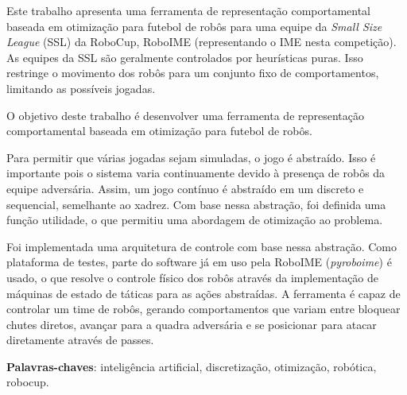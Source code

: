 \setlength{\absparsep}{18pt} %
\begin{resumo}

  Este trabalho apresenta uma ferramenta de representação comportamental baseada
  em otimização para futebol de robôs para uma equipe da \textit{Small Size
  League} (SSL) da RoboCup, RoboIME (representando o IME nesta competição).  As
  equipes da SSL são geralmente controlados por heurísticas puras.  Isso
  restringe o movimento dos robôs para um conjunto fixo de comportamentos,
  limitando as possíveis jogadas.

  O objetivo deste trabalho é desenvolver uma ferramenta de representação
  comportamental baseada em otimização para futebol de robôs.

  Para permitir que várias jogadas sejam simuladas, o jogo é abstraído.  Isso é
  importante pois o sistema varia continuamente devido à presença de robôs da
  equipe adversária.  Assim, um jogo contínuo é abstraído em um discreto e
  sequencial, semelhante ao xadrez.  Com base nessa abstração, foi definida uma
  função utilidade, o que permitiu uma abordagem de otimização ao problema.

  Foi implementada uma arquitetura de controle com base nessa abstração.  Como
  plataforma de testes, parte do software já em uso pela RoboIME
  (\textit{pyroboime}) é usado, o que resolve o controle físico dos robôs
  através da implementação de máquinas de estado de táticas para as ações
  abstraídas.  A ferramenta é capaz de controlar um time de robôs, gerando
  comportamentos que variam entre bloquear chutes diretos, avançar para a quadra
  adversária e se posicionar para atacar diretamente através de passes.

  \textbf{Palavras-chaves}: inteligência artificial, discretização, otimização, robótica, robocup.
\end{resumo}

